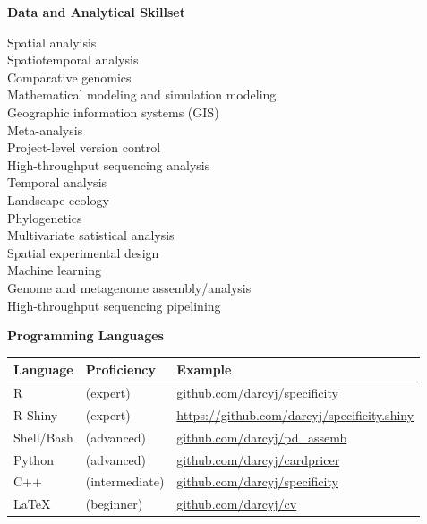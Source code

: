 \documentclass{article}
\begin{document}
{\large  \textbf{Data and Analytical Skillset}}
  \begin{adjustwidth}{2mm}{}\begin{multicols}{2}
    Spatial analyisis \cite{Darcy2018a,Darcy2011a,Darcy640029}\\
    Spatiotemporal analysis \cite{Darcy640029,Darcy2017,Nemergut2016}\\
    Comparative genomics \cite{Darcy2018,Lynch2014}\\
    Mathematical modeling and simulation modeling \cite{Darcy685644,Darcy640029, Darcy2016}\\
    Geographic information systems (GIS) \cite{Darcy640029,Darcy2018a,Darcy2017}\\
    Meta-analysis \cite{Darcy685644,Darcy2018a,Darcy2011a}\\
    Project-level version control \cite[\href{https://github.com/darcyj/specificity}{specificity} R package]{Darcy2018}\\
    High-throughput sequencing analysis \cite{Darcy685644,Darcy640029,Darcy2018a}\\

    Temporal analysis \cite{Darcy685644,Knelman2014,Kennedy2016}\\
    Landscape ecology \cite{Darcy640029,Darcy2018,Darcy2017}\\
    Phylogenetics \cite{Darcy2011a,Schmidt2015a,Naff2013}\\
    Multivariate satistical analysis \cite{Darcy640029,Darcy2017,Gendron2019}\\
    Spatial experimental design \cite{Darcy2018a,Darcy2017,Darcy2018}\\
    Machine learning \cite{Darcy2021,Amend2022}\\
    Genome and metagenome assembly/analysis \cite{Darcy2018,Lynch2014}\\
    High-throughput sequencing pipelining \cite{Darcy685644,Darcy640029,Darcy2018a}

  \end{multicols}\end{adjustwidth}
\pagebreak
{\large  \textbf{Programming Languages}}
\\\begin{tabular}{l l l}
  Language & Proficiency & Example\\
  \hline
  R & (expert) & \href{https://github.com/darcyj/specificity}{github.com/darcyj/specificity}\\
  R Shiny & (expert) & \href{https://github.com/darcyj/specificity.shiny}{https://github.com/darcyj/specificity.shiny}\\
  Shell/Bash & (advanced) & \href{https://github.com/darcyj/pd_assemb}{github.com/darcyj/pd\_assemb}\\
  Python & (advanced) & \href{https://github.com/darcyj/cardpricer}{github.com/darcyj/cardpricer}\\
  C++ & (intermediate) & \href{https://github.com/darcyj/specificity}{github.com/darcyj/specificity}\\ 
  \LaTeX & (beginner) & \href{https://github.com/darcyj/cv}{github.com/darcyj/cv}\\
\end{tabular}
\end{document}
